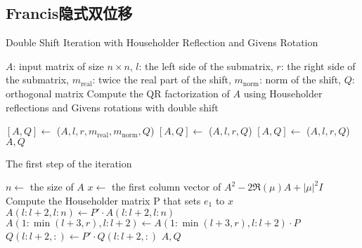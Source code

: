 \documentclass[12pt, a4paper, oneside]{ctexart}
\begin{document}
\newpage
\begin{appendices}
    \renewcommand{\thesection}{\Alph{section}}
    \section{Francis隐式双位移}
    \begin{algorithm}
        \caption{Double Shift Iteration with Householder Reflection and Givens Rotation}
        \begin{algorithmic}[1]
            \Require $A$: input matrix of size $n \times n$, $l$: the left side of the submatrix, $r$: the right side of the submatrix, $m_{\text{real}}$: twice the real part of the shift, $m_{\text{norm}}$: norm of the shift, $Q$: orthogonal matrix
            \Ensure Compute the QR factorization of $A$ using Householder reflections and Givens rotations with double shift
            
                \State $[A, Q] \gets$ ($A, l, r, m_{\text{real}}, m_{\text{norm}}, Q$)
                \State $[A, Q] \gets$ ($A, l, r, Q$)
                \State $[A, Q] \gets$ ($A, l, r, Q$)
                \State \Return $A, Q$
            \EndFunction
        \end{algorithmic}
    \end{algorithm}

    \begin{algorithm}
        \caption{The first step of the iteration}
        \begin{algorithmic}[1]
                \State $n \gets$ the size of $A$
                \State $x \gets$ the first column vector of $A^2-2\Re(\mu)A+|\mu|^2I$
                \State Compute the Householder matrix P that sets $e_1$ to $x$
                \State $A(l:l+2, l:n) \gets P' \cdot A(l:l+2, l:n)$
                \State $A(1:\min(l+3, r), l:l+2) \gets A(1:\min(l+3, r), l:l+2) \cdot P$
                \State $Q(l:l+2, :) \gets P' \cdot Q(l:l+2, :)$
                \State \Return $A, Q$
            \EndFunction
        \end{algorithmic}
    \end{algorithm}


\end{appendices}
\end{document}
